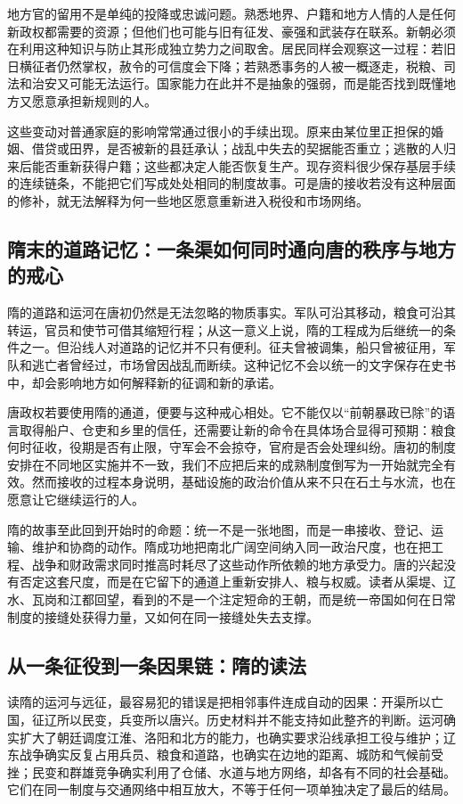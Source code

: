 地方官的留用不是单纯的投降或忠诚问题。熟悉地界、户籍和地方人情的人是任何新政权都需要的资源；但他们也可能与旧有征发、豪强和武装存在联系。新朝必须在利用这种知识与防止其形成独立势力之间取舍。居民同样会观察这一过程：若旧日横征者仍然掌权，赦令的可信度会下降；若熟悉事务的人被一概逐走，税粮、司法和治安又可能无法运行。国家能力在此并不是抽象的强弱，而是能否找到既懂地方又愿意承担新规则的人。

这些变动对普通家庭的影响常常通过很小的手续出现。原来由某位里正担保的婚姻、借贷或田界，是否被新的县廷承认；战乱中失去的契据能否重立；逃散的人归来后能否重新获得户籍；这些都决定人能否恢复生产。现存资料很少保存基层手续的连续链条，不能把它们写成处处相同的制度故事。可是唐的接收若没有这种层面的修补，就无法解释为何一些地区愿意重新进入税役和市场网络。

\subsection{隋末的道路记忆：一条渠如何同时通向唐的秩序与地方的戒心}
隋的道路和运河在唐初仍然是无法忽略的物质事实。军队可沿其移动，粮食可沿其转运，官员和使节可借其缩短行程；从这一意义上说，隋的工程成为后继统一的条件之一。但沿线人对道路的记忆并不只有便利。征夫曾被调集，船只曾被征用，军队和逃亡者曾经过，市场曾因战乱而断续。这种记忆不会以统一的文字保存在史书中，却会影响地方如何解释新的征调和新的承诺。

唐政权若要使用隋的通道，便要与这种戒心相处。它不能仅以“前朝暴政已除”的语言取得船户、仓吏和乡里的信任，还需要让新的命令在具体场合显得可预期：粮食何时征收，役期是否有止限，守军会不会掠夺，官府是否会处理纠纷。唐初的制度安排在不同地区实施并不一致，我们不应把后来的成熟制度倒写为一开始就完全有效。然而接收的过程本身说明，基础设施的政治价值从来不只在石土与水流，也在愿意让它继续运行的人。

隋的故事至此回到开始时的命题：统一不是一张地图，而是一串接收、登记、运输、维护和协商的动作。隋成功地把南北广阔空间纳入同一政治尺度，也在把工程、战争和财政需求同时推高时耗尽了这些动作所依赖的地方承受力。唐的兴起没有否定这套尺度，而是在它留下的通道上重新安排人、粮与权威。读者从渠堤、辽水、瓦岗和江都回望，看到的不是一个注定短命的王朝，而是统一帝国如何在日常制度的接缝处获得力量，又如何在同一接缝处失去支撑。

\subsection{从一条征役到一条因果链：隋的读法}
读隋的运河与远征，最容易犯的错误是把相邻事件连成自动的因果：开渠所以亡国，征辽所以民变，兵变所以唐兴。历史材料并不能支持如此整齐的判断。运河确实扩大了朝廷调度江淮、洛阳和北方的能力，也确实要求沿线承担工役与维护；辽东战争确实反复占用兵员、粮食和道路，也确实在边地的距离、城防和气候前受挫；民变和群雄竞争确实利用了仓储、水道与地方网络，却各有不同的社会基础。它们在同一制度与交通网络中相互放大，不等于任何一项单独决定了最后的结局。

